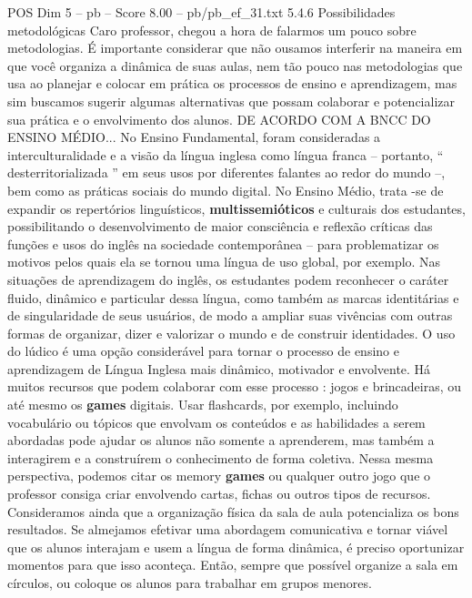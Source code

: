 \begin{textsample}{POS Dim 5 – pb – Score 8.00 – pb/pb\_ef\_31.txt}  \label{ex:f5_pos_095}
5.4.6 Possibilidades metodológicas Caro professor, chegou a hora de falarmos um pouco sobre metodologias.
É importante considerar que não ousamos interferir na maneira em que você organiza a dinâmica de suas aulas, nem tão pouco nas metodologias que usa ao planejar e colocar em prática os processos de ensino e aprendizagem, mas sim buscamos sugerir algumas alternativas que possam colaborar e potencializar sua prática e o envolvimento dos alunos.
DE ACORDO COM A BNCC DO ENSINO MÉDIO...
No Ensino Fundamental, foram consideradas a interculturalidade e a visão da língua inglesa como língua franca – portanto, “ desterritorializada ” em seus usos por diferentes falantes ao redor do mundo –, bem como as práticas sociais do mundo digital.
No Ensino Médio, trata -se de expandir os repertórios linguísticos, \textbf{multissemióticos} e culturais dos estudantes, possibilitando o desenvolvimento de maior consciência e reflexão críticas das funções e usos do inglês na sociedade contemporânea – para problematizar os motivos pelos quais ela se tornou uma língua de uso global, por exemplo.
Nas situações de aprendizagem do inglês, os estudantes podem reconhecer o caráter fluido, dinâmico e particular dessa língua, como também as marcas identitárias e de singularidade de seus usuários, de modo a ampliar suas vivências com outras formas de organizar, dizer e valorizar o mundo e de construir identidades.
O uso do lúdico é uma opção considerável para tornar o processo de ensino e aprendizagem de Língua Inglesa mais dinâmico, motivador e envolvente.
Há muitos recursos que podem colaborar com esse processo : jogos e brincadeiras, ou até mesmo os \textbf{games} digitais.
Usar flashcards, por exemplo, incluindo vocabulário ou tópicos que envolvam os conteúdos e as habilidades a serem abordadas pode ajudar os alunos não somente a aprenderem, mas também a interagirem e a construírem o conhecimento de forma coletiva.
Nessa mesma perspectiva, podemos citar os memory \textbf{games} ou qualquer outro jogo que o professor consiga criar envolvendo cartas, fichas ou outros tipos de recursos.
Consideramos ainda que a organização física da sala de aula potencializa os bons resultados.
Se almejamos efetivar uma abordagem comunicativa e tornar viável que os alunos interajam e usem a língua de forma dinâmica, é preciso oportunizar momentos para que isso aconteça.
Então, sempre que possível organize a sala em círculos, ou coloque os alunos para trabalhar em grupos menores.

\end{textsample}
